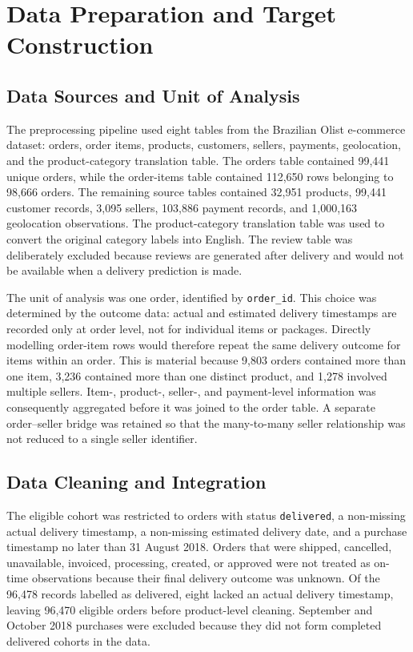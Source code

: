 \section{Data Preparation and Target Construction}
\label{sec:data_preparation}

\subsection{Data Sources and Unit of Analysis}

The preprocessing pipeline used eight tables from the Brazilian Olist e-commerce dataset: orders, order items, products, customers, sellers, payments, geolocation, and the product-category translation table. The orders table contained 99,441 unique orders, while the order-items table contained 112,650 rows belonging to 98,666 orders. The remaining source tables contained 32,951 products, 99,441 customer records, 3,095 sellers, 103,886 payment records, and 1,000,163 geolocation observations. The product-category translation table was used to convert the original category labels into English. The review table was deliberately excluded because reviews are generated after delivery and would not be available when a delivery prediction is made.

The unit of analysis was one order, identified by \texttt{order\_id}. This choice was determined by the outcome data: actual and estimated delivery timestamps are recorded only at order level, not for individual items or packages. Directly modelling order-item rows would therefore repeat the same delivery outcome for items within an order. This is material because 9,803 orders contained more than one item, 3,236 contained more than one distinct product, and 1,278 involved multiple sellers. Item-, product-, seller-, and payment-level information was consequently aggregated before it was joined to the order table. A separate order--seller bridge was retained so that the many-to-many seller relationship was not reduced to a single seller identifier.

\subsection{Data Cleaning and Integration}

The eligible cohort was restricted to orders with status \texttt{delivered}, a non-missing actual delivery timestamp, a non-missing estimated delivery date, and a purchase timestamp no later than 31 August 2018. Orders that were shipped, cancelled, unavailable, invoiced, processing, created, or approved were not treated as on-time observations because their final delivery outcome was unknown. Of the 96,478 records labelled as delivered, eight lacked an actual delivery timestamp, leaving 96,470 eligible orders before product-level cleaning. September and October 2018 purchases were excluded because they did not form completed delivered cohorts in the data.

